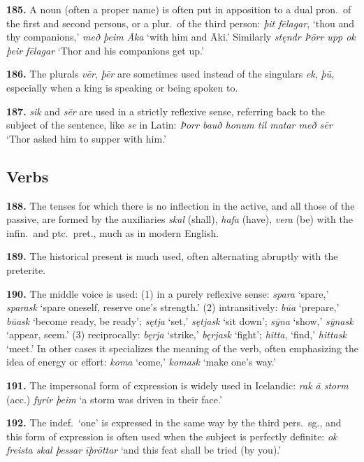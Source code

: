 \documentclass[12pt,letterpaper]{book}
\begin{document}
\textbf{185.} A noun (often a proper name) is often put in apposition to a
dual pron.\ of the first and second persons, or a plur.\ of the
third person: \textit{þit fēlagar}, `thou and thy companions,' \textit{með
þeim Āka} `with him and Āki.'  Similarly \textit{stęndr Þōrr upp ok þeir
fēlagar} `Thor and his companions get up.'

\textbf{186.} The plurals \textit{vēr}, \textit{þēr} are sometimes used instead of the
singulars \textit{ek}, \textit{þū}, especially when a king is speaking or being
spoken to.

\textbf{187.} \textit{sik} and \textit{sēr} are used in a strictly reflexive sense,
referring back to the subject of the sentence, like \textit{se} in
Latin: \textit{Þorr bauð honum til matar með sēr} `Thor asked him to
supper with him.'

\subsection{Verbs}

\textbf{188.} The tenses for which there is no inflection in the active,
and all those of the passive, are formed by the auxiliaries
\textit{skal} (shall), \textit{hafa} (have), \textit{vera} (be) with the
infin.\ and ptc.\ pret., much as in modern English.

\textbf{189.} The historical present is much used, often alternating
abruptly with the preterite.

\textbf{190.} The middle voice is used: (1) in a purely reflexive sense:
\textit{spara} `spare,' \textit{sparask} `spare oneself, reserve one's
strength.'  (2) intransitively: \textit{būa} `prepare,' \textit{būask} `become
ready, be ready'; \textit{sętja} `set,' \textit{sętjask} `sit down';
\textit{sȳna} `show,' \textit{sȳnask} `appear, seem.'  (3) reciprocally:
\textit{bęrja} `strike,' \textit{bęrjask} `fight'; \textit{hitta}, `find,'
\textit{hittask} `meet.'  In other cases it specializes the meaning of
the verb, often emphasizing the idea of energy or effort: \textit{koma}
`come,' \textit{komask} `make one's way.'

\textbf{191.} The impersonal form of expression is widely used in
Icelandic: \textit{rak ā storm} (acc.) \textit{fyrir þeim} `a storm was driven
in their face.'

\textbf{192.} The indef.\ `one' is expressed in the same way by the third
pers.\ sg., and this form of expression is often used when the
subject is perfectly definite: \textit{ok freista skal þessar īþrōttar}
`and this feat shall be tried (by you).'
\end{document}
